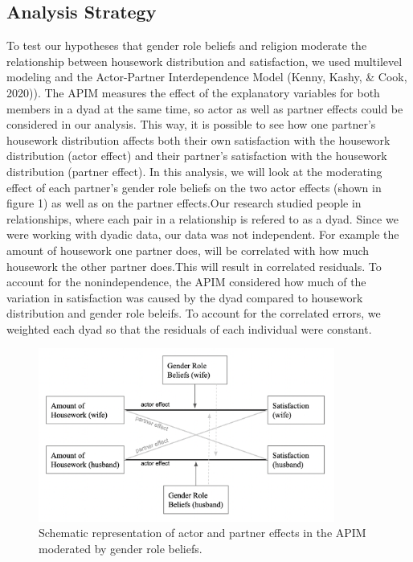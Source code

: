 \documentclass[
  man,floatsintext]{apa6}
\begin{document}
\hypertarget{analysis-strategy}{%
\subsection{Analysis Strategy}\label{analysis-strategy}}

To test our hypotheses that gender role beliefs and religion moderate the relationship between housework distribution and satisfaction, we used multilevel modeling and the Actor-Partner Interdependence Model (Kenny, Kashy, \& Cook, 2020)). The APIM measures the effect of the explanatory variables for both members in a dyad at the same time, so actor as well as partner effects could be considered in our analysis. This way, it is possible to see how one partner's housework distribution affects both their own satisfaction with the housework distribution (actor effect) and their partner's satisfaction with the housework distribution (partner effect). In this analysis, we will look at the moderating effect of each partner's gender role beliefs on the two actor effects (shown in figure 1) as well as on the partner effects.Our research studied people in relationships, where each pair in a relationship is refered to as a dyad. Since we were working with dyadic data, our data was not independent. For example the amount of housework one partner does, will be correlated with how much housework the other partner does.This will result in correlated residuals. To account for the nonindependence, the APIM considered how much of the variation in satisfaction was caused by the dyad compared to housework distribution and gender role beleifs. To account for the correlated errors, we weighted each dyad so that the residuals of each individual were constant.



\begin{figure}
\includegraphics[width=3.83in]{APIM} \caption{Schematic representation of actor and partner effects in the APIM moderated by gender role beliefs.}\label{fig:unnamed-chunk-47}
\end{figure}
\end{document}
